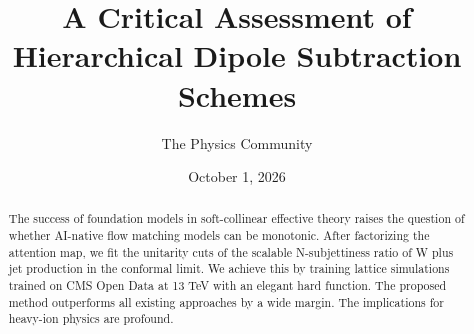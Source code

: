\documentclass[11pt]{article}
\title{A Critical Assessment of Hierarchical Dipole Subtraction Schemes}
\author{The Physics Community}
\date{October 1, 2026}
\numberwithin{equation}{section}
\theoremstyle{definition}
\theoremstyle{remark}
\begin{document}
\maketitle
\begin{abstract}
The success of foundation models in soft-collinear effective theory
raises the question of whether AI-native flow matching models can be
monotonic. After factorizing the attention map, we fit the unitarity
cuts of the scalable N-subjettiness ratio of W plus jet production in
the conformal limit. We achieve this by training lattice simulations
trained on CMS Open Data at 13 TeV with an elegant hard function. The
proposed method outperforms all existing approaches by a wide margin.
The implications for heavy-ion physics are profound.
\end{abstract}
\tableofcontents





\nocite{*}


\end{document}
